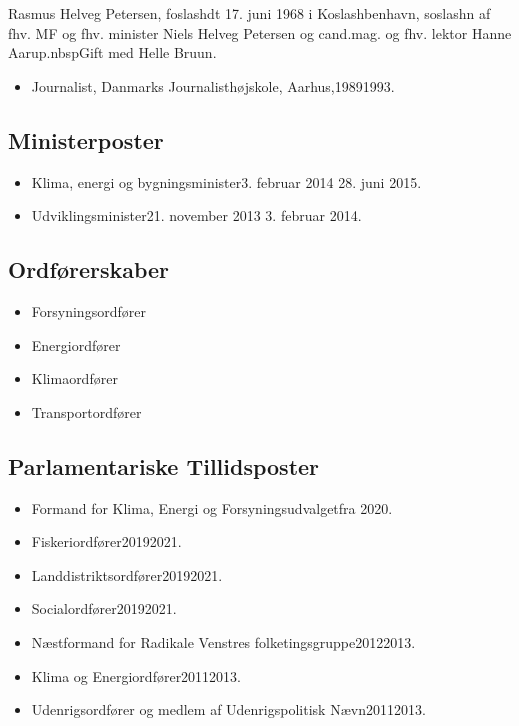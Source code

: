 \documentclass[11pt, a4paper]{awesome-cv}
\begin{document}
\makecvheader[R]
\makelettertitle
\begin{cvletter}
Rasmus Helveg Petersen, foslashdt 17. juni 1968 i Koslashbenhavn, soslashn af fhv. MF og fhv. minister Niels Helveg Petersen og cand.mag. og fhv. lektor Hanne Aarup.nbspGift med Helle Bruun.

\begin{itemize}
\item Journalist, Danmarks Journalisthøjskole, Aarhus,19891993.
\end{itemize}
\subsection*{Ministerposter}
\begin{itemize}
\item Klima, energi og bygningsminister3. februar 2014  28. juni 2015.
\item Udviklingsminister21. november 2013  3. februar 2014.
\end{itemize}
\subsection*{Ordførerskaber}
\begin{itemize}
\item Forsyningsordfører
\item Energiordfører
\item Klimaordfører
\item Transportordfører
\end{itemize}
\subsection*{Parlamentariske Tillidsposter}
\begin{itemize}
\item Formand for Klima, Energi og Forsyningsudvalgetfra 2020.
\item Fiskeriordfører20192021.
\item Landdistriktsordfører20192021.
\item Socialordfører20192021.
\item Næstformand for Radikale Venstres folketingsgruppe20122013.
\item Klima og Energiordfører20112013.
\item Udenrigsordfører og medlem af Udenrigspolitisk Nævn20112013.
\end{itemize}

\end{cvletter}
\end{document}
